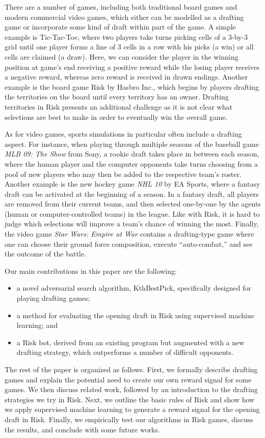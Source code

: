 \documentclass[letterpaper]{article}
\numberwithin{equation}{section}
\numberwithin{theorem}{section}
\numberwithin{lemma}{section}
\numberwithin{df}{section}
\begin{document}
There are a number of games, including both traditional board games and modern commercial video games, which either can be modelled as a drafting game or incorporate some kind of draft within part of the game.  A simple example is Tic-Tac-Toe, where two players take turns picking cells of a 3-by-3 grid until one player forms a line of 3 cells in a row with his picks (a win) or all cells are claimed (a draw).  Here, we can consider the player in the winning position at game's end receiving a positive reward while the losing player receives a negative reward, whereas zero reward is received in drawn endings.  Another example is the board game Risk by Hasbro Inc., which begins by players drafting the territories on the board until every territory has an owner.  Drafting territories in Risk presents an additional challenge as it is not clear what selections are best to make in order to eventually win the overall game.  

As for video games, sports simulations in particular often include a drafting aspect.  For instance, when playing through multiple seasons of the baseball game \textit{MLB 09: The Show} from Sony, a rookie draft takes place in between each season, where the human player and the computer opponents take turns choosing from a pool of new players who may then be added to the respective team's roster.  Another example is the new hockey game \textit{NHL 10} by EA Sports, where a fantasy draft can be activated at the beginning of a season.  In a fantasy draft, all players are removed from their current teams, and then selected one-by-one by the agents (human or computer-controlled teams) in the league.  Like with Risk, it is hard to judge which selections will improve a team's chance of winning the most.  Finally, the video game \textit{Star Wars: Empire at War} contains a drafting-type game where one can choose their ground force composition, execute ``auto-combat,'' and see the outcome of the battle.

Our main contributions in this paper are the following:
\begin{itemize}
	\item a novel adversarial search algorithm, KthBestPick, specifically designed for playing drafting games;
	\item a method for evaluating the opening draft in Risk using supervised machine learning; and
	\item a Risk bot, derived from an existing program but augmented with a new drafting strategy, which outperforms a number of difficult opponents.
\end{itemize}
The rest of the paper is organized as follows.  First, we formally describe drafting games and explain the potential need to create our own reward signal for some games.  We then discuss related work, followed by an introduction to the drafting strategies we try in Risk.  Next, we outline the basic rules of Risk and show how we apply supervised machine learning to generate a reward signal for the opening draft in Risk.  Finally, we empirically test our algorithms in Risk games, discuss the results, and conclude with some future works.
\end{document}
